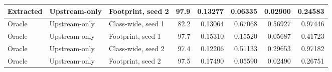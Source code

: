 \begin{tabular}{lllrrrrr}
Extracted & Upstream-only & Footprint, seed 2 & 97.9 & 0.13277 & 0.06335 & 0.02900 & 0.24583 \\
\midrule
Oracle & Upstream-only & Class-wide, seed 1 & 82.2 & 0.13064 & 0.67068 & 0.56927 & 0.97446 \\
Oracle & Upstream-only & Footprint, seed 1 & 97.7 & 0.15310 & 0.15520 & 0.05687 & 0.41723 \\
Oracle & Upstream-only & Class-wide, seed 2 & 97.4 & 0.12206 & 0.51133 & 0.29653 & 0.97182 \\
Oracle & Upstream-only & Footprint, seed 2 & 97.5 & 0.17490 & 0.05590 & 0.02490 & 0.26751 \\
\bottomrule
\end{tabular}
